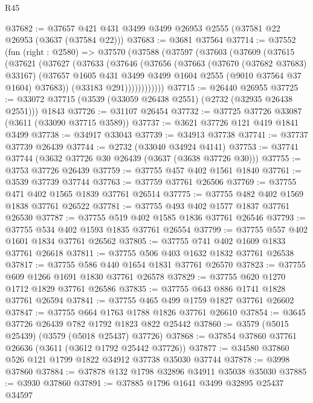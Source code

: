 \begin{lexlean}{R45}
\begin{coremodule}
@37682 := @37657 @421 @431 @3499 @3499 @26953 @2555 (@37581 @22 @26953 (@3637 (@37584 @22)))
@37683 := @3681 @37564
@37714 := @37552
    (fun (right : @2580) =>
    @37570
      (@37588
        (@37597
          (@37603
            (@37609
              (@37615
                (@37621
                  (@37627
                    (@37633
                      (@37646
                        (@37656
                          (@37663
                            (@37670 (@37682 @37683) @33167)
                            (@37657
                              @1605
                              @431
                              @3499
                              @3499
                              @1604
                              @2555
                              (@9010 @37564 @37 @1604)
                              @37683))
                          (@33183 @291))))))))))))
@37715 := @26440 @26955
@37725 := @33072 @37715 (@3539 (@33059 @26438 @2551) (@2732 (@32935 @26438 @2551))) @1843
@37726 := @31107 @26454
@37732 := @37725 @37726 @33087 (@3611 (@33090 @37715 @3589))
@37737 := @3621 @37726 @121 @419 @1841 @3499
@37738 := @34917 @33043
@37739 := @34913 @37738
@37741 := @37737 @37739 @26439
@37744 := @2732 (@33040 @34924 @4141)
@37753 := @37741 @37744 (@3632 @37726 @30 @26439 (@3637 (@3638 @37726 @30)))
@37755 := @3753 @37726 @26439
@37759 := @37755 @457 @402 @1561 @1840
@37761 := @3539 @37739 @37744
@37763 := @37759 @37761 @26506
@37769 := @37755 @471 @402 @1565 @1839 @37761 @26514
@37775 := @37755 @482 @402 @1569 @1838 @37761 @26522
@37781 := @37755 @493 @402 @1577 @1837 @37761 @26530
@37787 := @37755 @519 @402 @1585 @1836 @37761 @26546
@37793 := @37755 @534 @402 @1593 @1835 @37761 @26554
@37799 := @37755 @557 @402 @1601 @1834 @37761 @26562
@37805 := @37755 @741 @402 @1609 @1833 @37761 @26618
@37811 := @37755 @506 @403 @1632 @1832 @37761 @26538
@37817 := @37755 @586 @440 @1654 @1831 @37761 @26570
@37823 := @37755 @609 @1266 @1691 @1830 @37761 @26578
@37829 := @37755 @620 @1270 @1712 @1829 @37761 @26586
@37835 := @37755 @643 @886 @1741 @1828 @37761 @26594
@37841 := @37755 @465 @499 @1759 @1827 @37761 @26602
@37847 := @37755 @664 @1763 @1788 @1826 @37761 @26610
@37854 := @3645 @37726 @26439 @782 @1792 @1823 @822 @25442
@37860 := @3579 (@5015 @25439) (@3579 (@5018 @25437) @37726)
@37868 := @37854 @37860 @37761 @26636 (@3611 (@3612 @1792 @25442 @37726))
@37877 := @34580 @37860 @526 @121 @1799 @1822 @34912 @37738 @35030 @37744
@37878 := @3998 @37860
@37884 := @37878 @132 @1798 @32896 @34911 @35038 @35030
@37885 := @3930 @37860
@37891 := @37885 @1796 @1641 @3499 @32895 @25437 @34597

\end{coremodule}
\end{lexlean}
